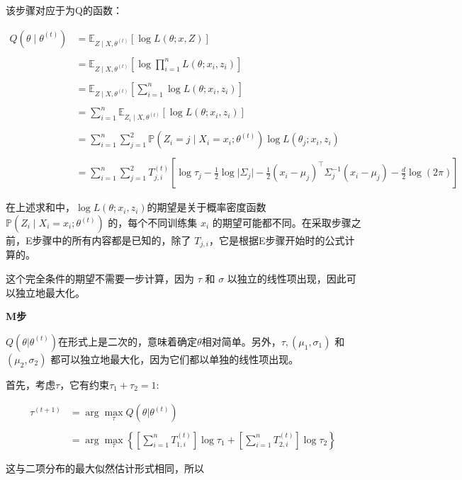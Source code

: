 该步骤对应于为Q的函数：

\begin{align}
Q(\theta \mid \theta^{(t)}) &= \mathbb{E}_{Z \mid X, \theta^{(t)}}[\log L(\theta; x, Z)] \\\\
&= \mathbb{E}_{Z \mid X, \theta^{(t)}}\left[\log \prod_{i=1}^{n} L(\theta; x_i, z_i)\right] \\\\
&= \mathbb{E}_{Z \mid X, \theta^{(t)}}\left[\sum_{i=1}^{n} \log L(\theta; x_i, z_i)\right] \\\\
&= \sum_{i=1}^{n} \mathbb{E}_{Z_i \mid X, \theta^{(t)}}[\log L(\theta; x_i, z_i)] \\\\
&= \sum_{i=1}^{n} \sum_{j=1}^{2} \mathbb{P}(Z_i = j \mid X_i = x_i; \theta^{(t)}) \log L(\theta_j; x_i, z_i) \\\\
&= \sum_{i=1}^{n} \sum_{j=1}^{2} T_{j,i}^{(t)} \left[\log \tau_j - \frac{1}{2} \log \lvert \Sigma_j \rvert - \frac{1}{2} (x_i - \mu_j)^\top \Sigma_j^{-1} (x_i - \mu_j) - \frac{d}{2} \log(2\pi)\right]~
\end{align}

在上述求和中，$\log L(\theta; x_i, z_i)$的期望是关于概率密度函数 $\mathbb{P}(Z_i \mid X_i = x_i; \theta^{(t)})$ 的，每个不同训练集 $x_i$ 的期望可能都不同。在采取步骤之前，E步骤中的所有内容都是已知的，除了 $T_{j,i}$，它是根据E步骤开始时的公式计算的。

这个完全条件的期望不需要一步计算，因为 $\tau$ 和 $\sigma$ 以独立的线性项出现，因此可以独立地最大化。

\textbf{M步}

$Q(\theta | \theta^{(t)})$在形式上是二次的，意味着确定$\theta$相对简单。另外，$\tau, (\mu_1, \sigma_1)$ 和 $(\mu_2, \sigma_2)$ 都可以独立地最大化，因为它们都以单独的线性项出现。

首先，考虑$\tau$，它有约束$\tau_1 + \tau_2 = 1$:

\begin{align}
\tau^{(t+1)} &= \arg \max_{\tau} Q(\theta | \theta^{(t)}) \\\\
&= \arg \max_{\tau} \left\{ \left[ \sum_{i=1}^n T_{1,i}^{(t)} \right] \log \tau_1 + \left[ \sum_{i=1}^n T_{2,i}^{(t)} \right] \log \tau_2 \right\}~
\end{align}

这与二项分布的最大似然估计形式相同，所以

